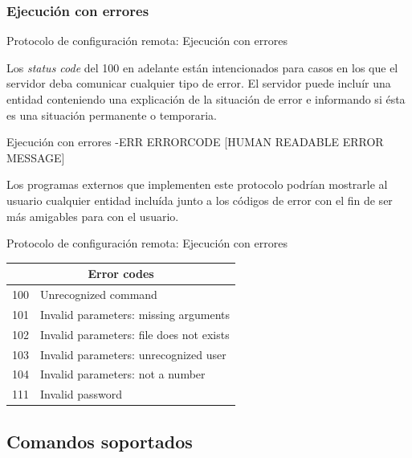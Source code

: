\documentclass{beamer}
\begin{document}
\subsubsection{Ejecución con errores}

\begin{frame}{Protocolo de configuración remota: Ejecución con errores}

\par Los \textit{status code} del 100 en adelante están intencionados para casos en los que el servidor deba comunicar cualquier tipo de error. El servidor puede incluír una entidad conteniendo una explicación de la situación de error e informando si ésta es una situación permanente o temporaria.\\

\begin{alertblock}{Ejecución con errores}
-ERR ERROR\textunderscore CODE [HUMAN READABLE ERROR MESSAGE]
\end{alertblock}


\par Los programas externos que implementen este protocolo podrían mostrarle al usuario cualquier entidad incluída junto a los códigos de error con el fin de ser más amigables para con el usuario.\\

\end{frame}

\begin{frame}{Protocolo de configuración remota: Ejecución con errores}

\begin{tabular}{|l|l|}
  \hline
  \multicolumn{2}{|c|}{Error codes} \\
  \hline
  \hline
  100 & Unrecognized command \\
  101 & Invalid parameters: missing arguments \\
  102 & Invalid parameters: file does not exists \\
  103 & Invalid parameters: unrecognized user \\
  104 & Invalid parameters: not a number \\
  111 & Invalid password \\
  \hline
\end{tabular}
\end{frame}


\subsection{Comandos soportados}
\end{document}

